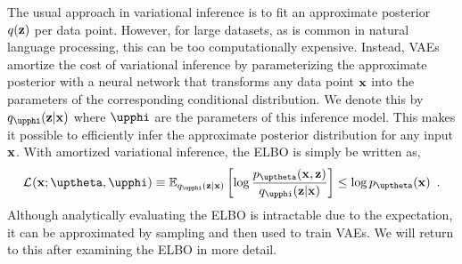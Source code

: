 The usual approach in variational inference is to fit an approximate posterior $q({\mathbf{z}})$ per data point. However, for large datasets, as is common in natural language processing, this can be too computationally expensive. 
Instead, VAEs amortize the cost of variational inference by parameterizing the approximate posterior with a neural network that transforms any data point ${\mathbf{x}}$ into the parameters of the corresponding conditional distribution. We denote this by $q_\phib(\zb|\xb)$ where $\phib$ are the parameters of this inference model. This makes it possible to efficiently infer the approximate posterior distribution for any input ${\mathbf{x}}$. 
With amortized variational inference, the ELBO is simply be written as,
%
\begin{equation} \label{eq:variational-autoencoder-elbo}
    \mathcal{L}_{}(\xb;\thetab,\phib) \equiv \mathbb{E}_{q_\phib(\zb|\xb)} \left[ \log \frac{p_\thetab(\xb,\zb)}{q_\phib(\zb|\xb)} \right] \leq \log p_\thetab(\xb) \enspace .
\end{equation}
%
Although analytically evaluating the ELBO is intractable due to the expectation, it can be approximated by sampling and then used to train VAEs. We will return to this after examining the ELBO in more detail.


